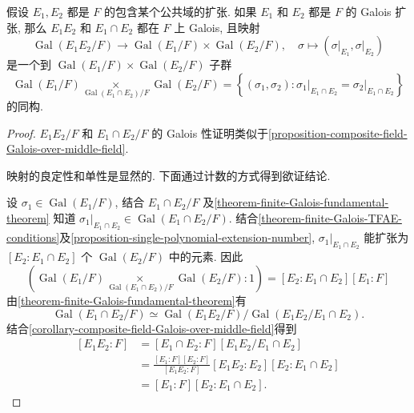 \begin{proposition}
  假设 \( E_1, E_2 \) 都是 \( F \) 的包含某个公共域的扩张.
  如果 \( E_1 \) 和 \( E_2 \) 都是 \( F \) 的 Galois 扩张, 那么 \( E_1 E_2 \) 和
  \( E_1 \cap E_2 \) 都在 \( F \) 上 Galois, 且映射
  \[
    \operatorname{Gal}(E_1E_2/F) \to \operatorname{Gal}(E_1/F) \times
    \operatorname{Gal}(E_2/F),\quad \sigma \mapsto
    (\left.\sigma\right\vert_{E_1}, \left.\sigma\right\vert_{E_2})
  \]
  是一个到 \( \operatorname{Gal}(E_1/F) \times \operatorname{Gal}(E_2/F) \)
  子群
  \[
    \operatorname{Gal}(E_1/F) \mathop{\times}\limits_{\operatorname{Gal}(E_1
      \cap E_2) / F} \operatorname{Gal}(E_2/F) = \left\lbrace (\sigma_1,
        \sigma_2): \left.\sigma_1\right\vert_{E_1 \cap E_2} =
          \left.\sigma_2\right\vert_{E_1 \cap E_2} \right\rbrace
  \]
  的同构.
\end{proposition}
\begin{proof}
  \( E_1E_2/F \) 和 \( E_1 \cap E_2/F \) 的 Galois
  性证明类似于\cref{proposition-composite-field-Galois-over-middle-field}.

  映射的良定性和单性是显然的.
  下面通过计数的方式得到欲证结论.

  设 \( \sigma_1 \in \operatorname{Gal}(E_1/F) \), 结合 \( E_1 \cap E_2 / F \)
  及\cref{theorem-finite-Galois-fundamental-theorem} 知道 \( \left. \sigma_1
    \right\vert_{E_1 \cap E_2} \in \operatorname{Gal}(E_1 \cap E_2/ F) \).
  结合\cref{theorem-finite-Galois-TFAE-conditions}及\cref{proposition-single-polynomial-extension-number},
  \( \left. \sigma_1 \right\vert_{E_1 \cap E_2} \) 能扩张为 \( [E_2: E_1 \cap
    E_2] \) 个 \( \operatorname{Gal}(E_2/F) \) 中的元素.
  因此
  \[
    (\operatorname{Gal}(E_1/F) \mathop{\times}\limits_{\operatorname{Gal}(E_1
    \cap E_2) / F} \operatorname{Gal}(E_2/F):1) = [E_2: E_1 \cap E_2] [E_1:F]
  \]
  由\cref{theorem-finite-Galois-fundamental-theorem}有
  \[
    \operatorname{Gal}(E_1 \cap E_2 / F) \simeq
    \operatorname{Gal}(E_1E_2/F)/\operatorname{Gal}(E_1E_2/E_1 \cap E_2).
  \]
  结合\cref{corollary-composite-field-Galois-over-middle-field}得到
  \[
    \begin{split}
      [E_1E_2: F] &= [E_1 \cap E_2: F][E_1E_2/E_1 \cap E_2]\\
                  &=\frac{[E_1:F][E_2:F]}{[E_1E_2:F]}[E_1E_2:E_2][E_2:E_1
                  \cap E_2]\\
                  &= [E_1:F][E_2: E_1 \cap E_2].
    \end{split}
  \]
\end{proof}


